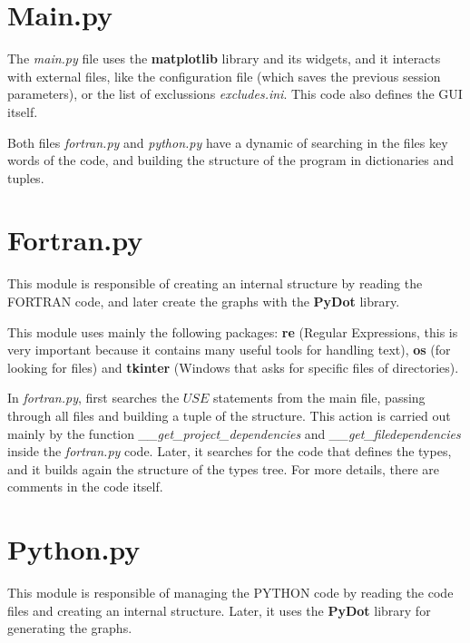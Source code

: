 
%

\section*{Main.py}

The \textit{main.py} file uses the \textbf{matplotlib} library and its widgets, and it interacts with external files, like the configuration file (which saves the previous session parameters), or the list of exclussions \textit{excludes.ini}. This code also defines the GUI itself.

Both files \textit{fortran.py} and \textit{python.py} have a dynamic of searching in the files key words of the code, and building the structure of the program in dictionaries and tuples.

\section*{Fortran.py}
This module is responsible of creating an internal structure by reading the FORTRAN code, and later create the graphs with the \textbf{PyDot} library.

This module uses mainly the following packages: \textbf{re} (Regular Expressions, this is very important because it contains many useful tools for handling text), \textbf{os} (for looking for files) and \textbf{tkinter} (Windows that asks for specific files of directories).

In \textit{fortran.py}, first searches the $USE$ statements from the main file, passing through all files and building a tuple of the structure. This action is carried out mainly by the function \textit{\_\_get\_project\_dependencies} and \textit{\_\_get\_filedependencies} inside the \textit{fortran.py} code.
Later, it searches for the code that defines the types, and it builds again the structure of the types tree.
 For more details, there are comments in the code itself.

\section*{Python.py}
This module is responsible of managing the PYTHON code by reading the code files and creating an internal structure. Later, it uses the \textbf{PyDot} library for generating the graphs.

